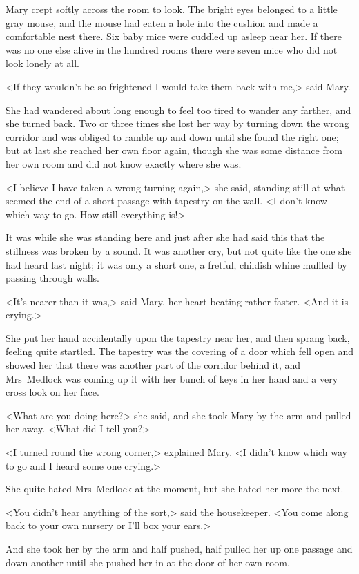 Mary crept softly across the room to look. The bright eyes belonged to a little gray mouse, and the mouse had eaten a hole into the cushion and made a comfortable nest there. Six baby mice were cuddled up asleep near her. If there was no one else alive in the hundred rooms there were seven mice who did not look lonely at all.

<If they wouldn't be so frightened I would take them back with me,> said Mary.

She had wandered about long enough to feel too tired to wander any farther, and she turned back. Two or three times she lost her way by turning down the wrong corridor and was obliged to ramble up and down until she found the right one; but at last she reached her own floor again, though she was some distance from her own room and did not know exactly where she was.

<I believe I have taken a wrong turning again,> she said, standing still at what seemed the end of a short passage with tapestry on the wall. <I don't know which way to go. How still everything is!>

It was while she was standing here and just after she had said this that the stillness was broken by a sound. It was another cry, but not quite like the one she had heard last night; it was only a short one, a fretful, childish whine muffled by passing through walls.

<It's nearer than it was,> said Mary, her heart beating rather faster. <And it is crying.>

She put her hand accidentally upon the tapestry near her, and then sprang back, feeling quite startled. The tapestry was the covering of a door which fell open and showed her that there was another part of the corridor behind it, and Mrs~Medlock was coming up it with her bunch of keys in her hand and a very cross look on her face.

<What are you doing here?> she said, and she took Mary by the arm and pulled her away. <What did I tell you?>

<I turned round the wrong corner,> explained Mary. <I didn't know which way to go and I heard some one crying.>

She quite hated Mrs~Medlock at the moment, but she hated her more the next.

<You didn't hear anything of the sort,> said the housekeeper. <You come along back to your own nursery or I'll box your ears.>

And she took her by the arm and half pushed, half pulled her up one passage and down another until she pushed her in at the door of her own room.


